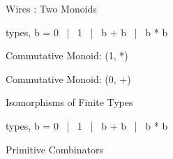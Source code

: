 \documentclass[svgnames,11pt]{beamer}
\begin{document}
\begin{frame}[fragile]{Wires : Two Monoids}


\begin{block}

  {{ types, b = 0 ~|~ 1 ~|~ b + b ~|~ b * b }}

\end{block}


  \begin{block}{Commutative Monoid: {{(1, *)}} }
    

  \end{block}

  \begin{block}{Commutative Monoid: {{(0, +)}} }


  \end{block}


\end{frame}


\begin{frame}[fragile]{ Isomorphisms of Finite Types }

\begin{block}

  {{ types, b = 0 ~|~ 1 ~|~ b + b ~|~ b * b }}

\end{block}


  \begin{block}{ Primitive Combinators }
    




  \end{block}


\end{frame}
\end{document}
